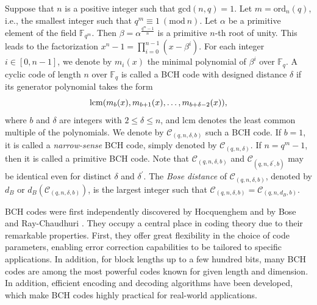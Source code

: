 \documentclass[journal,onecolumn]{IEEEtran}
\begin{document}
Suppose that $n$ is a positive integer such that $\mathrm{gcd}(n,q)=1$.  Let   $m=\mathrm{ord}_n(q)$,  i.e., the smallest integer such that 
$q^m\equiv 1 \ (\mathrm{mod}\ n).$ Let 
$\alpha$ be a primitive element of the field  $\mathbb{F}_{q^m}$.   Then $\beta=\alpha^{\frac{q^m-1}{n}} $ is a primitive $n$-th root of unity.  This leads to the  factorization  $x^n-1=\prod\limits_{i=0}^{n-1}(x-\beta^i).$  
For each integer $i\in [0,n-1]$,  we denote by $m_i(x)$ the minimal polynomial of $\beta^i$ over $\mathbb{F}_q$.  
A cyclic  code  of length  $n$  over $\mathbb{F}_q$ is called a  BCH code with designed distance $\delta$  if its generator polynomial takes the form 
\begin{equation}\notag
\mathrm{lcm}(m_b(x),m_{b+1}(x),\ldots,m_{b+\delta-2}(x)), 
\end{equation}
where  $b$  and $\delta$ are integers with $2\leq \delta\leq n$, 
and  $\mathrm{lcm}$ denotes the least common multiple of the polynomials.    
We denote  by $\mathcal{C}_{(q,  n,\delta, b)}$ such a BCH code.  If $b=1$, it  is called  a \emph{narrow-sense} BCH code, simply denoted by $\mathcal{C}_{(q,n, \delta)}$. If $n=q^m-1$, then  it is called a primitive BCH code. 
 Note that $\mathcal{C}_{(q,n,\delta,b)}$ and $\mathcal{C}_{(q,n,
    \delta^{'}, b)}$ 
may be identical even for distinct $\delta$ and $\delta^{'}$.  The \textit{Bose distance} of $\mathcal{C}_{(q,n,\delta,b)}$, denoted by $d_B$ or $d_B(\mathcal{C}_{(q,n,\delta,b)})$, is the largest integer such that $\mathcal{C}_{(q,n,\delta,b)}=\mathcal{C}_{(q,n,d_B,b)} $.  

 BCH codes were first 
independently discovered by Hocquenghem \cite{H1959} and by Bose and Ray-Chaudhuri \cite{BC1960f,BR1960}. They  occupy a central place in coding theory due to their remarkable properties. First, they offer great flexibility in the choice of code parameters, enabling error correction capabilities to be tailored to specific applications. In addition,  for block lengths up to a few hundred bits, many BCH codes are among the most powerful codes known for given length and dimension.  In addition, efficient encoding and decoding algorithms have been developed,  which make BCH codes highly practical for real-world applications.
\end{document}
